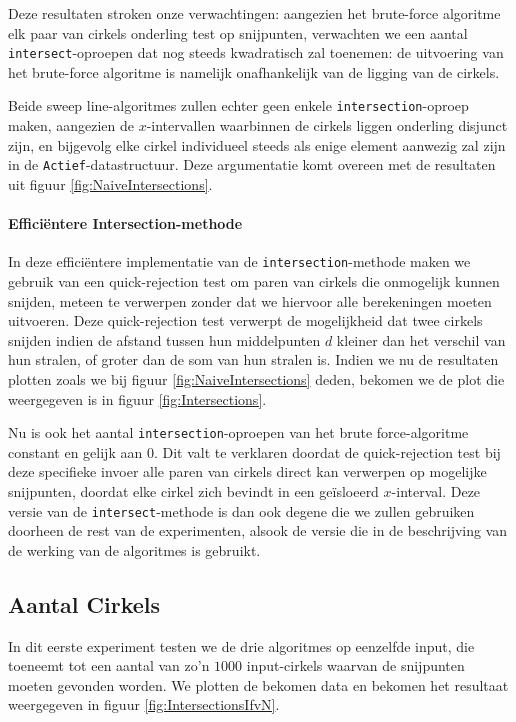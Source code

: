 \documentclass[12pt]{article}
\begin{document}
Deze resultaten stroken onze verwachtingen: aangezien het brute-force algoritme elk paar van cirkels onderling test op snijpunten, verwachten we een aantal \texttt{intersect}-oproepen dat nog steeds kwadratisch zal toenemen: de uitvoering van het brute-force algoritme is namelijk onafhankelijk van de ligging van de cirkels. 

Beide sweep line-algoritmes zullen echter geen enkele \texttt{intersection}-oproep maken, aangezien de $x$-intervallen waarbinnen de cirkels liggen onderling disjunct zijn, en bijgevolg elke cirkel individueel steeds als enige element aanwezig zal zijn in de  \texttt{Actief}-datastructuur. Deze argumentatie komt overeen met de resultaten uit figuur \ref{fig:NaiveIntersections}.

\paragraph{Efficiëntere Intersection-methode}
In deze efficiëntere implementatie van de \texttt{intersection}-methode maken we gebruik van een quick-rejection test om paren van cirkels die onmogelijk kunnen snijden, meteen te verwerpen zonder dat we hiervoor alle berekeningen moeten uitvoeren. Deze quick-rejection test verwerpt de mogelijkheid dat twee cirkels snijden indien de afstand tussen hun middelpunten $d$ kleiner dan het verschil van hun stralen, of groter dan de som van hun stralen is. Indien we nu de resultaten plotten zoals we bij figuur \ref{fig:NaiveIntersections} deden, bekomen we de plot die weergegeven is in figuur \ref{fig:Intersections}.

Nu is ook het aantal \texttt{intersection}-oproepen van het brute force-algoritme constant en gelijk aan $0$. Dit valt te verklaren doordat de quick-rejection test bij deze specifieke invoer alle paren van cirkels direct kan verwerpen op mogelijke snijpunten, doordat elke cirkel zich bevindt in een geïsloeerd $x$-interval. Deze versie van de \texttt{intersect}-methode is dan ook degene die we zullen gebruiken doorheen de rest van de experimenten, alsook de versie die in de beschrijving van de werking van de algoritmes is gebruikt. 

\subsection{Aantal Cirkels}
In dit eerste experiment testen we de drie algoritmes op eenzelfde input, die toeneemt tot een aantal van zo'n $1000$ input-cirkels waarvan de snijpunten moeten gevonden worden. We plotten de bekomen data en bekomen het resultaat weergegeven in figuur \ref{fig:IntersectionsIfvN}. 
\end{document}
